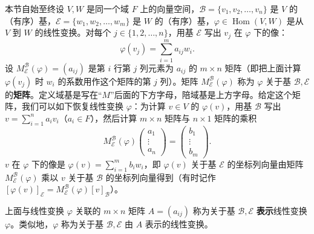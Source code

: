 本节自始至终设 \(V, W\) 是同一个域 \(F\) 上的向量空间，\(\mathcal{B} = \{v_1, v_2, \ldots, v_n\}\) 是 \(V\) 的（有序）基，\(\mathcal{E} = \{w_1, w_2, \ldots, w_m\}\) 是 \(W\) 的（有序）基，\(\varphi \in \operatorname{Hom}(V, W)\) 是从 \(V\) 到 \(W\) 的线性变换。对每个 \(j \in \{1, 2, \ldots, n\}\)，用基 \(\mathcal{E}\) 写出 \(v_j\) 在 \(\varphi\) 下的像：
\begin{equation}
\varphi(v_j) = \sum_{i=1}^m a_{ij}w_i. \tag{11.3}
\end{equation}
设 \(M_{\mathcal{E}}^{\mathcal{B}}(\varphi) = (a_{ij})\) 是第 \(i\) 行第 \(j\) 列元素为 \(a_{ij}\) 的 \(m \times n\) 矩阵（即把上面计算 \(\varphi(v_j)\) 时 \(w_i\) 的系数用作这个矩阵的第 \(j\) 列）。矩阵 \(M_{\mathcal{E}}^{\mathcal{B}}(\varphi)\) 称为 \(\varphi\) 关于基 \(\mathcal{B}, \mathcal{E}\) 的\textbf{矩阵}。定义域基是写在“\(M\)”后面的下方字母，陪域基是上方字母。给定这个矩阵，我们可以如下恢复线性变换 \(\varphi\)：为计算 \(v \in V\) 的 \(\varphi(v)\)，用基 \(\mathcal{B}\) 写出 \(v = \sum_{i=1}^n a_iv_i\)（\(a_i \in F\)），然后计算 \(m \times n\) 矩阵与 \(n \times 1\) 矩阵的乘积
\[
M_{\mathcal{E}}^{\mathcal{B}}(\varphi) \begin{pmatrix} a_1 \\ \vdots \\ a_n \end{pmatrix} = \begin{pmatrix} b_1 \\ \vdots \\ b_m \end{pmatrix}.
\]
\(v\) 在 \(\varphi\) 下的像是 \(\varphi(v) = \sum_{i=1}^m b_iw_i\)，即 \(\varphi(v)\) 关于基 \(\mathcal{E}\) 的坐标列向量由矩阵 \(M_{\mathcal{E}}^{\mathcal{B}}(\varphi)\) 乘以 \(v\) 关于基 \(\mathcal{B}\) 的坐标列向量得到（有时记作 \([\varphi(v)]_{\mathcal{E}} = M_{\mathcal{E}}^{\mathcal{B}}(\varphi)[v]_{\mathcal{B}}\)）。

\begin{definition}
上面与线性变换 \(\varphi\) 关联的 \(m \times n\) 矩阵 \(A = (a_{ij})\) 称为关于基 \(\mathcal{B}, \mathcal{E}\) \textbf{表示}线性变换 \(\varphi\)。类似地，\(\varphi\) 称为关于基 \(\mathcal{B}, \mathcal{E}\) 由 \(A\) 表示的线性变换。
\end{definition}

